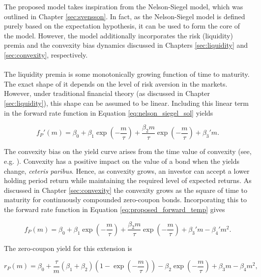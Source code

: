 \documentclass[a4paper]{artikel3}
\numberwithin{equation}{section}
\numberwithin{theorem}{section}
\numberwithin{proposition}{section}
\numberwithin{lemma}{section}
\begin{document}
The proposed model takes inspiration from the Nelson-Siegel model, which was outlined in Chapter \ref{sec:svensson}. In fact, as the Nelson-Siegel model is defined purely based on the expectation hypothesis, it can be used to form the core of the model. However, the model additionally incorporates the risk (liquidity) premia and the convexity bias dynamics discussed in Chapters \ref{sec:liquidity} and \ref{sec:convexity}, respectively. \\
\\
The liquidity premia is some monotonically growing function of time to maturity. The exact shape of it depends on the level of risk aversion in the markets. However, under traditional financial theory (as discussed in Chapter \ref{sec:liquidity}), this shape can be assumed to be linear. Including this linear term in the forward rate function in Equation \eqref{eq:nelson_siegel_sol} yields

\begin{equation}
    \label{eq:proposed_forward_temp}
    f_{P}'(m) = \beta_0 + \beta_1 \exp \left( -\frac{m}{\tau} \right) + \frac{\beta_2m}{\tau} \exp \left( -\frac{m}{\tau} \right) + \beta_3' m .
\end{equation}

The convexity bias on the yield curve arises from the time value of convexity (see, e.g. \cite{christensen_sorensen_1994}). Convexity has a positive impact on the value of a bond when the yields change, \textit{ceteris paribus}. Hence, as convexity grows, an investor can accept a lower holding period return while maintaining the required level of expected returns. As discussed in Chapter \ref{sec:convexity} the convexity grows as the square of time to maturity for continuously compounded zero-coupon bonds. Incorporating this to the forward rate function in Equation \eqref{eq:proposed_forward_temp} gives

\begin{equation}
    \label{eq:proposed_forward}
    f_{P}(m) = \beta_0 + \beta_1 \exp \left( -\frac{m}{\tau} \right) + \frac{\beta_2m}{\tau} \exp \left( -\frac{m}{\tau} \right) + \beta_3' m - \beta_4' m^2 .
\end{equation}

The zero-coupon yield for this extension is

\begin{equation}
    \label{eq:proposed_model}
    r_{P}(m) =  \beta_0 + \frac{\tau}{m} (\beta_1 + \beta_2) \left(1 - \exp \left( - \frac{m}{\tau} \right) \right) - \beta_2 \exp \left( - \frac{m}{\tau} \right)  + \beta_3 m - \beta_4 m^2,
\end{equation}
\end{document}
